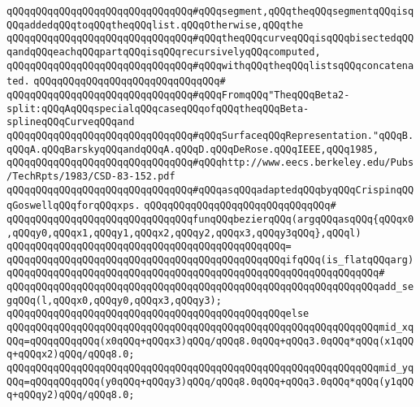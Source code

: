 \verb|qQQqqQQqqQQqqQQqqQQqqQQqqQQqqQQq#qQQqsegment,qQQqtheqQQqsegmentqQQqisqQQqaddedqQQqtoqQQqtheqQQqlist.qQQqOtherwise,qQQqthe|\newline
\verb|qQQqqQQqqQQqqQQqqQQqqQQqqQQqqQQq#qQQqtheqQQqcurveqQQqisqQQqbisectedqQQqandqQQqeachqQQqpartqQQqisqQQqrecursivelyqQQqcomputed,|\newline
\verb|qQQqqQQqqQQqqQQqqQQqqQQqqQQqqQQq#qQQqwithqQQqtheqQQqlistsqQQqconcatenated.|\newline
\verb|qQQqqQQqqQQqqQQqqQQqqQQqqQQqqQQq#|\newline
\verb|qQQqqQQqqQQqqQQqqQQqqQQqqQQqqQQq#qQQqFromqQQq"TheqQQqBeta2-split:qQQqAqQQqspecialqQQqcaseqQQqofqQQqtheqQQqBeta-splineqQQqCurveqQQqand|\newline
\verb|qQQqqQQqqQQqqQQqqQQqqQQqqQQqqQQq#qQQqSurfaceqQQqRepresentation."qQQqB.qQQqA.qQQqBarskyqQQqandqQQqA.qQQqD.qQQqDeRose.qQQqIEEE,qQQq1985,|\newline
\verb|qQQqqQQqqQQqqQQqqQQqqQQqqQQqqQQq#qQQqhttp://www.eecs.berkeley.edu/Pubs/TechRpts/1983/CSD-83-152.pdf|\newline
\verb|qQQqqQQqqQQqqQQqqQQqqQQqqQQqqQQq#qQQqasqQQqadaptedqQQqbyqQQqCrispinqQQqGoswellqQQqforqQQqxps.|\newline
\verb|qQQqqQQqqQQqqQQqqQQqqQQqqQQqqQQq#|\newline
\verb|qQQqqQQqqQQqqQQqqQQqqQQqqQQqqQQqfunqQQqbezierqQQq(argqQQqasqQQq{qQQqx0,qQQqy0,qQQqx1,qQQqy1,qQQqx2,qQQqy2,qQQqx3,qQQqy3qQQq},qQQql)|\newline
\verb|qQQqqQQqqQQqqQQqqQQqqQQqqQQqqQQqqQQqqQQqqQQqqQQq=|\newline
\verb|qQQqqQQqqQQqqQQqqQQqqQQqqQQqqQQqqQQqqQQqqQQqqQQqifqQQq(is_flatqQQqarg)|\newline
\verb|qQQqqQQqqQQqqQQqqQQqqQQqqQQqqQQqqQQqqQQqqQQqqQQqqQQqqQQqqQQqqQQq#|\newline
\verb|qQQqqQQqqQQqqQQqqQQqqQQqqQQqqQQqqQQqqQQqqQQqqQQqqQQqqQQqqQQqqQQqadd_segqQQq(l,qQQqx0,qQQqy0,qQQqx3,qQQqy3);|\newline
\verb|qQQqqQQqqQQqqQQqqQQqqQQqqQQqqQQqqQQqqQQqqQQqqQQqelse|\newline
\verb|qQQqqQQqqQQqqQQqqQQqqQQqqQQqqQQqqQQqqQQqqQQqqQQqqQQqqQQqqQQqqQQqmid_xqQQq=qQQqqQQqqQQq(x0qQQq+qQQqx3)qQQq/qQQq8.0qQQq+qQQq3.0qQQq*qQQq(x1qQQq+qQQqx2)qQQq/qQQq8.0;|\newline
\verb|qQQqqQQqqQQqqQQqqQQqqQQqqQQqqQQqqQQqqQQqqQQqqQQqqQQqqQQqqQQqqQQqmid_yqQQq=qQQqqQQqqQQq(y0qQQq+qQQqy3)qQQq/qQQq8.0qQQq+qQQq3.0qQQq*qQQq(y1qQQq+qQQqy2)qQQq/qQQq8.0;|\newline
\newline
